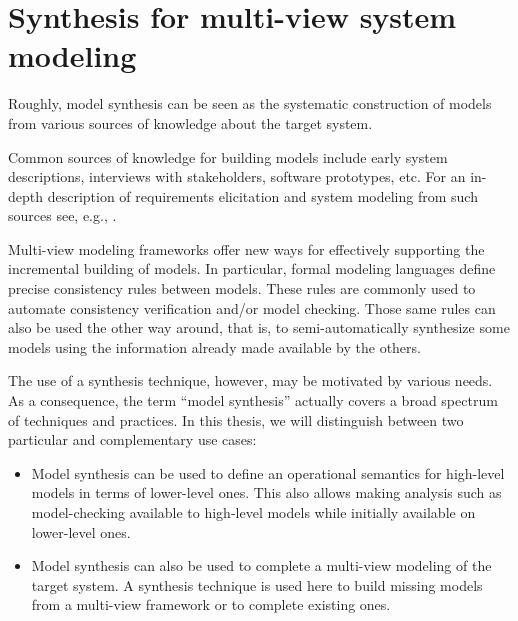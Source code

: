 \section{Synthesis for multi-view system modeling\label{section:intro-synthesis}}

Roughly, model synthesis can be seen as the systematic construction of models from various sources of knowledge about the target system. 

Common sources of knowledge for building models include early system descriptions, interviews with stakeholders, software prototypes, etc. For an in-depth description of requirements elicitation and system modeling from such sources see, e.g., \cite{VanLamsweerde:2009}.

Multi-view modeling frameworks offer new ways for effectively supporting the incremental building of models. In particular, formal modeling languages define precise consistency rules between models. These rules are commonly used to automate consistency verification and/or model checking. Those same rules can also be used the other way around, that is, to semi-automatically synthesize some models using the information already made available by the others.

The use of a synthesis technique, however, may be motivated by various needs. As a consequence, the term ``model synthesis'' actually covers a broad spectrum of techniques and practices. In this thesis, we will distinguish between two particular and complementary use cases:
\begin{itemize}
\item Model synthesis can be used to define an operational semantics for high-level models in terms of lower-level ones. This also allows making analysis such as model-checking available to high-level models while initially available on lower-level ones.
\item Model synthesis can also be used to complete a multi-view modeling of the target system. A synthesis technique is used here to build missing models from a multi-view framework or to complete existing ones.
\end{itemize}

